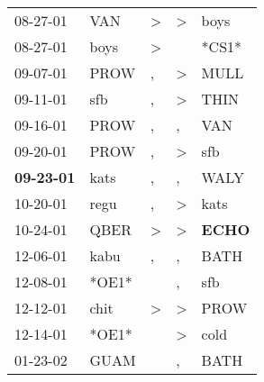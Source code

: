 \begin{supertabular}{p{0.07\textwidth}p{0.06\textwidth}p{0.02\textwidth}p{0.02\textwidth}p{0.06\textwidth}}
          08-27-01\textsuperscript{} &            VAN\textsuperscript{} &     \textgreater &     \textgreater &           boys\textsuperscript{} \\
          08-27-01\textsuperscript{} &           boys\textsuperscript{} &     \textgreater &                  &                            *CS1* \\
          09-07-01\textsuperscript{} &           PROW\textsuperscript{} &                , &     \textgreater &           MULL\textsuperscript{} \\
          09-11-01\textsuperscript{} &            sfb\textsuperscript{} &                , &     \textgreater &           THIN\textsuperscript{} \\
          09-16-01\textsuperscript{} &           PROW\textsuperscript{} &                , &                , &            VAN\textsuperscript{} \\
          09-20-01\textsuperscript{} &           PROW\textsuperscript{} &                , &     \textgreater &            sfb\textsuperscript{} \\
 \textbf{09-23-01\textsuperscript{}} &           kats\textsuperscript{} &                , &                , &           WALY\textsuperscript{} \\
          10-20-01\textsuperscript{} &           regu\textsuperscript{} &                , &     \textgreater &           kats\textsuperscript{} \\
          10-24-01\textsuperscript{} &           QBER\textsuperscript{} &     \textgreater &     \textgreater &  \textbf{ECHO\textsuperscript{}} \\
          12-06-01\textsuperscript{} &           kabu\textsuperscript{} &                , &                , &           BATH\textsuperscript{} \\
          12-08-01\textsuperscript{} &                            *OE1* &                  &                , &            sfb\textsuperscript{} \\
          12-12-01\textsuperscript{} &           chit\textsuperscript{} &     \textgreater &     \textgreater &           PROW\textsuperscript{} \\
          12-14-01\textsuperscript{} &                            *OE1* &                  &     \textgreater &           cold\textsuperscript{} \\
          01-23-02\textsuperscript{} &           GUAM\textsuperscript{} &                  &                , &           BATH\textsuperscript{} \\

\end{supertabular}
